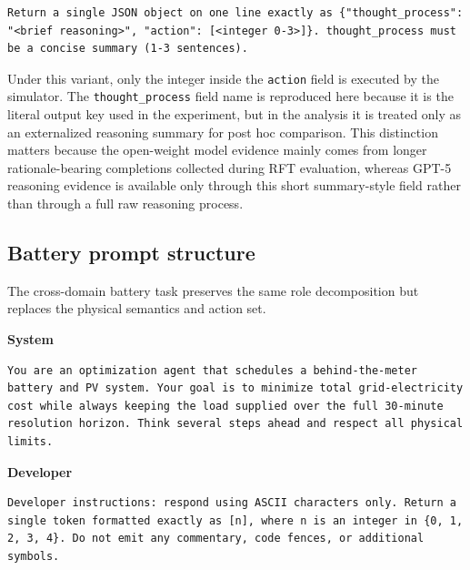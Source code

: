 \documentclass[11pt]{article}
\newcommand{\promptrole}[1]{\par\Needspace*{6\baselineskip}\noindent\textbf{#1}\par\nopagebreak}
\begin{document}
\begin{lstlisting}[style=promptblock]
Return a single JSON object on one line exactly as {"thought_process": "<brief reasoning>", "action": [<integer 0-3>]}. thought_process must be a concise summary (1-3 sentences).
\end{lstlisting}

Under this variant, only the integer inside the \texttt{action} field is executed by the simulator. The \texttt{thought\_process} field name is reproduced here because it is the literal output key used in the experiment, but in the analysis it is treated only as an externalized reasoning summary for post hoc comparison. This distinction matters because the open-weight model evidence mainly comes from longer rationale-bearing completions collected during RFT evaluation, whereas GPT-5 reasoning evidence is available only through this short summary-style field rather than through a full raw reasoning process.

\subsection{Battery prompt structure}
The cross-domain battery task preserves the same role decomposition but replaces the physical semantics and action set.

\promptrole{System}
\begin{lstlisting}[style=promptblock]
You are an optimization agent that schedules a behind-the-meter battery and PV system. Your goal is to minimize total grid-electricity cost while always keeping the load supplied over the full 30-minute resolution horizon. Think several steps ahead and respect all physical limits.
\end{lstlisting}

\promptrole{Developer}
\begin{lstlisting}[style=promptblock]
Developer instructions: respond using ASCII characters only. Return a single token formatted exactly as [n], where n is an integer in {0, 1, 2, 3, 4}. Do not emit any commentary, code fences, or additional symbols.
\end{lstlisting}
\end{document}
